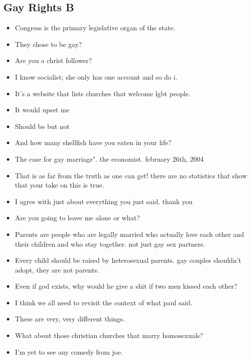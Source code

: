 \documentclass[tikz]{article}
\begin{document}
\begin{multicols}{2}
    \vfill
    \columnbreak

    \subsection*{Gay Rights B}
    \begin{itemize}[noitemsep,nolistsep,label={}]
      \item{Congress is the primary legislative organ of the state.}
      \item{They chose to be gay?}
      \item{Are you a christ follower?}
      \item{I know socialist; she only has one account and so do i.}
      \item{It's a website that lists churches that welcome lgbt people.}
      \item{It would upset me}
      \item{Should be but not}
      \item{And how many shellfish have you eaten in your life?}
      \item{The case for gay marriage". the economist. february 26th, 2004}
      \item{That is as far from the truth as one can get! there are no statistics that show that your take on this is true.}
      \item{I agree with just about everything you just said. thank you}
      \item{Are you going to leave me alone or what?}
      \item{Parents are people who are legally married who actually love each other and their children and who stay together. not just gay sex partners.}
      \item{Every child should be raised by heterosexual parents. gay couples shouldn't adopt, they are not parents.}
      \item{Even if god exists, why would he give a shit if two men kissed each other?}
      \item{I think we all need to revisit the context of what paul said.}
      \item{These are very, very different things.}
      \item{What about those christian churches that marry homosexuals?}
      \item{I'm yet to see any comedy from joe.}

\end{itemize}
\end{multicols}
\end{document}
